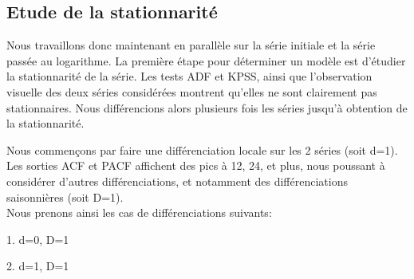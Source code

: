 \documentclass[12pt,a4paper]{book}
\newcommand{\1}{\mathds{1}}
\begin{document}
\vspace{60 mm}
\subsection{Etude de la stationnarité}

\vspace{5 mm}

Nous travaillons donc maintenant en parallèle sur la série initiale et la série passée au logarithme.
La première étape pour déterminer un modèle est d'étudier la stationnarité de la série. Les tests ADF et KPSS, ainsi que l'observation visuelle des deux séries considérées montrent qu'elles ne sont clairement pas stationnaires.
Nous différencions alors plusieurs fois les séries jusqu'à obtention de la stationnarité.

Nous commençons par faire une différenciation locale sur les 2 séries (soit d=1). Les sorties ACF et PACF affichent des pics à 12, 24, et plus, nous poussant à considérer d'autres différenciations, et notamment des différenciations saisonnières (soit D=1).\\
Nous prenons ainsi les cas de différenciations suivants:
\begin{description}
  \item 1. d=0, D=1
  \item 2. d=1, D=1
\end{description}
\end{document}
